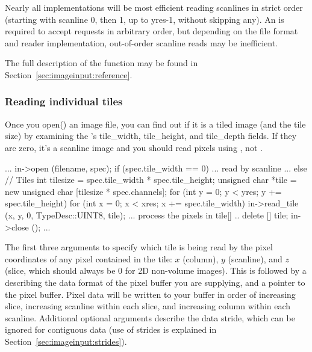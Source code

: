 Nearly all \ImageInput implementations will be most efficient reading
scanlines in strict order (starting with scanline 0, then 1, up to {\kw
  yres-1}, without skipping any).  An \ImageInput is required to accept
\readscanline requests in arbitrary order, but depending on the file
format and reader implementation, out-of-order scanline reads may be
inefficient.

The full description of the \readscanline function may be found
in Section~\ref{sec:imageinput:reference}.

\subsubsection{Reading individual tiles}

Once you {\kw open()} an image file, you can find out if it is a tiled
image (and the tile size) by examining the \ImageSpec's {\cf
  tile_width}, {\cf tile_height}, and {\cf tile_depth} fields.
If they are zero, it's a scanline image and you should read pixels
using \readscanline, not \readtile.

\begin{code}
        ...
        in->open (filename, spec);
        if (spec.tile_width == 0) {
            ... read by scanline ...
        } else {
            // Tiles
            int tilesize = spec.tile_width * spec.tile_height;
            unsigned char *tile = new unsigned char [tilesize * spec.channels];
            for (int y = 0;  y < yres;  y += spec.tile_height) {
                for (int x = 0;  x < xres;  x += spec.tile_width) {
                    in->read_tile (x, y, 0, TypeDesc::UINT8, tile);
                    ... process the pixels in tile[] ..
                }
            }
            delete [] tile;
        }
        in->close ();
        ...
\end{code}

The first three arguments to \readtile specify which tile is
being read by the pixel coordinates of any pixel contained in the
tile: $x$ (column), $y$ (scanline), and $z$ (slice, which should always
be 0 for 2D non-volume images).  This is followed by a \TypeDesc
describing the data format of the pixel buffer you are supplying, and a
pointer to the pixel buffer.  Pixel data will be written to your buffer
in order of increasing slice, increasing
scanline within each slice, and increasing column within each scanline.
Additional optional arguments describe the data stride, which can be
ignored for contiguous data (use of strides is explained in
Section~\ref{sec:imageinput:strides}).

